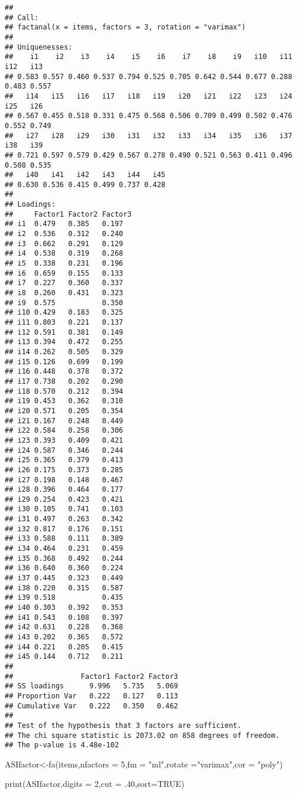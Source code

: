 \documentclass[
]{article}
\newenvironment{Shaded}{\begin{snugshade}}{\end{snugshade}}
\newcommand{\AttributeTok}[1]{\textcolor[rgb]{0.77,0.63,0.00}{#1}}
\newcommand{\ConstantTok}[1]{\textcolor[rgb]{0.00,0.00,0.00}{#1}}
\newcommand{\DecValTok}[1]{\textcolor[rgb]{0.00,0.00,0.81}{#1}}
\newcommand{\FunctionTok}[1]{\textcolor[rgb]{0.00,0.00,0.00}{#1}}
\newcommand{\NormalTok}[1]{#1}
\newcommand{\OtherTok}[1]{\textcolor[rgb]{0.56,0.35,0.01}{#1}}
\newcommand{\StringTok}[1]{\textcolor[rgb]{0.31,0.60,0.02}{#1}}
\begin{document}
\begin{verbatim}
## 
## Call:
## factanal(x = items, factors = 3, rotation = "varimax")
## 
## Uniquenesses:
##    i1    i2    i3    i4    i5    i6    i7    i8    i9   i10   i11   i12   i13 
## 0.583 0.557 0.460 0.537 0.794 0.525 0.705 0.642 0.544 0.677 0.288 0.483 0.557 
##   i14   i15   i16   i17   i18   i19   i20   i21   i22   i23   i24   i25   i26 
## 0.567 0.455 0.518 0.331 0.475 0.568 0.506 0.709 0.499 0.502 0.476 0.552 0.749 
##   i27   i28   i29   i30   i31   i32   i33   i34   i35   i36   i37   i38   i39 
## 0.721 0.597 0.579 0.429 0.567 0.278 0.490 0.521 0.563 0.411 0.496 0.508 0.535 
##   i40   i41   i42   i43   i44   i45 
## 0.630 0.536 0.415 0.499 0.737 0.428 
## 
## Loadings:
##     Factor1 Factor2 Factor3
## i1  0.479   0.385   0.197  
## i2  0.536   0.312   0.240  
## i3  0.662   0.291   0.129  
## i4  0.538   0.319   0.268  
## i5  0.338   0.231   0.196  
## i6  0.659   0.155   0.133  
## i7  0.227   0.360   0.337  
## i8  0.260   0.431   0.323  
## i9  0.575           0.350  
## i10 0.429   0.183   0.325  
## i11 0.803   0.221   0.137  
## i12 0.591   0.381   0.149  
## i13 0.394   0.472   0.255  
## i14 0.262   0.505   0.329  
## i15 0.126   0.699   0.199  
## i16 0.448   0.378   0.372  
## i17 0.738   0.202   0.290  
## i18 0.570   0.212   0.394  
## i19 0.453   0.362   0.310  
## i20 0.571   0.205   0.354  
## i21 0.167   0.248   0.449  
## i22 0.584   0.258   0.306  
## i23 0.393   0.409   0.421  
## i24 0.587   0.346   0.244  
## i25 0.365   0.379   0.413  
## i26 0.175   0.373   0.285  
## i27 0.198   0.148   0.467  
## i28 0.396   0.464   0.177  
## i29 0.254   0.423   0.421  
## i30 0.105   0.741   0.103  
## i31 0.497   0.263   0.342  
## i32 0.817   0.176   0.151  
## i33 0.588   0.111   0.389  
## i34 0.464   0.231   0.459  
## i35 0.368   0.492   0.244  
## i36 0.640   0.360   0.224  
## i37 0.445   0.323   0.449  
## i38 0.220   0.315   0.587  
## i39 0.518           0.435  
## i40 0.303   0.392   0.353  
## i41 0.543   0.108   0.397  
## i42 0.631   0.228   0.368  
## i43 0.202   0.365   0.572  
## i44 0.221   0.205   0.415  
## i45 0.144   0.712   0.211  
## 
##                Factor1 Factor2 Factor3
## SS loadings      9.996   5.735   5.069
## Proportion Var   0.222   0.127   0.113
## Cumulative Var   0.222   0.350   0.462
## 
## Test of the hypothesis that 3 factors are sufficient.
## The chi square statistic is 2073.02 on 858 degrees of freedom.
## The p-value is 4.48e-102
\end{verbatim}

\begin{Shaded}
\begin{Highlighting}[]
\NormalTok{ASIfactor}\OtherTok{\textless{}{-}}\FunctionTok{fa}\NormalTok{(items,}\AttributeTok{nfactors =} \DecValTok{5}\NormalTok{,}\AttributeTok{fm =} \StringTok{"ml"}\NormalTok{,}\AttributeTok{rotate =}\StringTok{"varimax"}\NormalTok{,}\AttributeTok{cor =} \StringTok{"poly"}\NormalTok{)}


\FunctionTok{print}\NormalTok{(ASIfactor,}\AttributeTok{digits =} \DecValTok{2}\NormalTok{,}\AttributeTok{cut =}\NormalTok{ .}\DecValTok{40}\NormalTok{,}\AttributeTok{sort=}\ConstantTok{TRUE}\NormalTok{)}
\end{Highlighting}
\end{Shaded}
\end{document}
